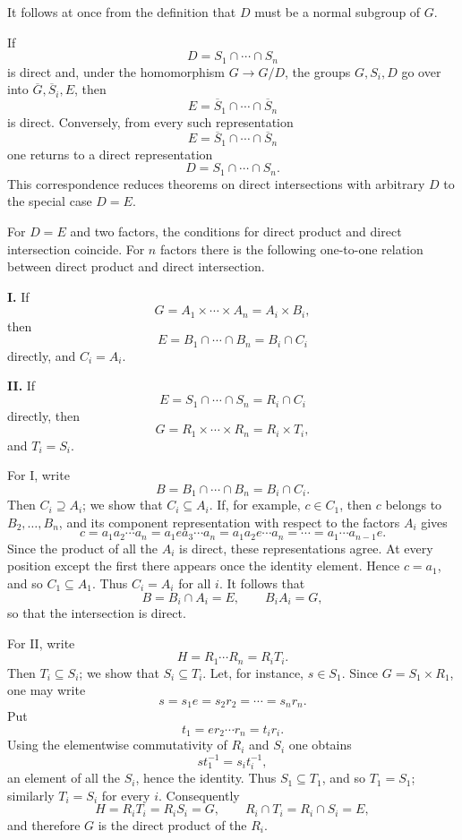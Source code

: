 \documentclass[11pt]{article}
\begin{document}
It follows at once from the definition that \(D\) must be a normal
subgroup of \(G\).

If \[
  D=S_1\cap\cdots\cap S_n
\] is direct and, under the homomorphism \(G\to G/D\), the groups
\(G,S_i,D\) go over into \(\overline G,\overline S_i,E\), then \[
  E=\overline S_1\cap\cdots\cap\overline S_n
\] is direct. Conversely, from every such representation \[
  E=\overline S_1\cap\cdots\cap\overline S_n
\] one returns to a direct representation \[
  D=S_1\cap\cdots\cap S_n.
\] This correspondence reduces theorems on direct intersections with
arbitrary \(D\) to the special case \(D=E\).

For \(D=E\) and two factors, the conditions for direct product and
direct intersection coincide. For \(n\) factors there is the following
one-to-one relation between direct product and direct intersection.

\textbf{I.} If \[
  G=A_1\times\cdots\times A_n=A_i\times B_i,
\] then \[
  E=B_1\cap\cdots\cap B_n=B_i\cap C_i
\] directly, and \(C_i=A_i\).

\textbf{II.} If \[
  E=S_1\cap\cdots\cap S_n=R_i\cap C_i
\] directly, then \[
  G=R_1\times\cdots\times R_n=R_i\times T_i,
\] and \(T_i=S_i\).

For I, write \[
  B=B_1\cap\cdots\cap B_n=B_i\cap C_i.
\] Then \(C_i\supseteq A_i\); we show that \(C_i\subseteq A_i\). If, for
example, \(c\in C_1\), then \(c\) belongs to \(B_2,\ldots,B_n\), and its
component representation with respect to the factors \(A_i\) gives \[
  c=a_1a_2\cdots a_n
   =a_1ea_3\cdots a_n
   =a_1a_2e\cdots a_n
   =\cdots=a_1\cdots a_{n-1}e.
\] Since the product of all the \(A_i\) is direct, these representations
agree. At every position except the first there appears once the
identity element. Hence \(c=a_1\), and so \(C_1\subseteq A_1\). Thus
\(C_i=A_i\) for all \(i\). It follows that \[
  B=B_i\cap A_i=E,
  \qquad B_iA_i=G,
\] so that the intersection is direct.

For II, write \[
  H=R_1\cdots R_n=R_iT_i.
\] Then \(T_i\subseteq S_i\); we show that \(S_i\subseteq T_i\). Let,
for instance, \(s\in S_1\). Since \(G=S_1\times R_1\), one may write \[
  s=s_1e=s_2r_2=\cdots=s_nr_n.
\] Put \[
  t_1=er_2\cdots r_n=t_ir_i.
\] Using the elementwise commutativity of \(R_i\) and \(S_i\) one
obtains \[
  s t_1^{-1}=s_it_i^{-1},
\] an element of all the \(S_i\), hence the identity. Thus
\(S_1\subseteq T_1\), and so \(T_1=S_1\); similarly \(T_i=S_i\) for
every \(i\). Consequently \[
  H=R_iT_i=R_iS_i=G,
  \qquad R_i\cap T_i=R_i\cap S_i=E,
\] and therefore \(G\) is the direct product of the \(R_i\).
\end{document}

